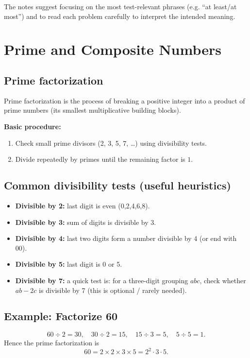\documentclass[12pt]{article}
\begin{document}
The notes suggest focusing on the most test-relevant phrases (e.g. ``at least/at most'') and to read each problem carefully to interpret the intended meaning.

\section{Prime and Composite Numbers}
\subsection{Prime factorization}
Prime factorization is the process of breaking a positive integer into a product of prime numbers (its smallest multiplicative building blocks).

\textbf{Basic procedure:}
\begin{enumerate}
  \item Check small prime divisors (2, 3, 5, 7, \ldots) using divisibility tests.
  \item Divide repeatedly by primes until the remaining factor is $1$.
\end{enumerate}

\subsection{Common divisibility tests (useful heuristics)}
\begin{itemize}
  \item \textbf{Divisible by 2:} last digit is even (0,2,4,6,8).
  \item \textbf{Divisible by 3:} sum of digits is divisible by 3.
  \item \textbf{Divisible by 4:} last two digits form a number divisible by 4 (or end with 00).
  \item \textbf{Divisible by 5:} last digit is 0 or 5.
  \item \textbf{Divisible by 7:} a quick test is: for a three-digit grouping $abc$, check whether $ab-2c$ is divisible by 7 (this is optional / rarely needed).
\end{itemize}

\subsection{Example: Factorize 60}
\[60\div 2 = 30,\quad 30\div 2 = 15,\quad 15\div 3 = 5,\quad 5\div 5 = 1.\]
Hence the prime factorization is
\[60=2\times 2\times 3\times 5=2^{2}\cdot 3\cdot 5.\]
\end{document}
